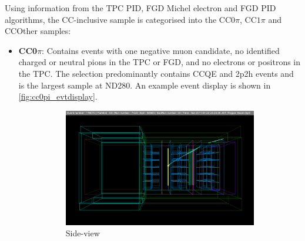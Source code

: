Using information from the TPC PID, FGD Michel electron and FGD PID algorithms, the \numu CC-inclusive sample is categorised into the CC$0\pi$, CC$1\pi$ and CCOther samples:
\begin{itemize}
	\item \textbf{CC0$\pi$}: Contains events with one negative muon candidate, no identified charged or neutral pions in the TPC or FGD, and no electrons or positrons in the TPC. The selection predominantly contains CCQE and 2p2h events and is the largest sample at ND280. An example event display is shown in \autoref{fig:cc0pi_evtdisplay}.
	\begin{figure}[h]
		\begin{subfigure}[t]{0.49\textwidth}
			\includegraphics[width=\textwidth, trim={25mm 28mm 30mm 30mm}, clip]{figures/numu/evtdisplay/CC0pi_7423_34_179070_perX0Z_all}
			\caption{Side-view}
		\end{subfigure}
		\begin{subfigure}[t]{0.49\textwidth}

\end{subfigure}
\end{figure}
\end{itemize}
